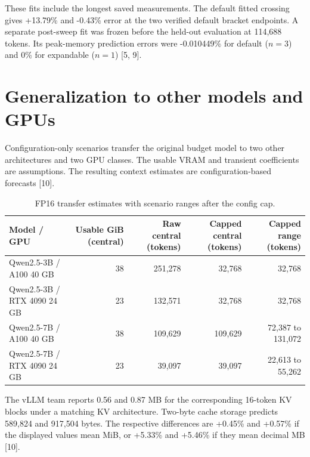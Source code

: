 \documentclass[11pt,a4paper]{article}
\begin{document}
These fits include the longest saved measurements. The default fitted crossing gives +13.79\% and -0.43\% error at the two verified default bracket endpoints. A separate post-sweep fit was frozen before the held-out evaluation at 114,688 tokens. Its peak-memory prediction errors were -0.010449\% for default ($n = 3$) and 0\% for expandable ($n = 1$) [5, 9].

\section{Generalization to other models and GPUs}
Configuration-only scenarios transfer the original budget model to two other architectures and two GPU classes. The usable VRAM and transient coefficients are assumptions. The resulting context estimates are configuration-based forecasts [10].

\begin{table}[htbp]
\centering
\small
\caption{FP16 transfer estimates with scenario ranges after the config cap.}
\begin{tabular}{lrrrr}
\toprule
\textbf{Model / GPU} & \textbf{Usable GiB (central)} & \textbf{Raw central (tokens)} & \textbf{Capped central (tokens)} & \textbf{Capped range (tokens)} \\
\midrule
Qwen2.5-3B / A100 40 GB      & 38 & 251,278 & 32,768  & 32,768 \\
Qwen2.5-3B / RTX 4090 24 GB  & 23 & 132,571 & 32,768  & 32,768 \\
Qwen2.5-7B / A100 40 GB      & 38 & 109,629 & 109,629 & 72,387 to 131,072 \\
Qwen2.5-7B / RTX 4090 24 GB  & 23 & 39,097  & 39,097  & 22,613 to 55,262 \\
\bottomrule
\end{tabular}
\end{table}

The vLLM team reports 0.56 and 0.87 MB for the corresponding 16-token KV blocks under a matching KV architecture. Two-byte cache storage predicts 589,824 and 917,504 bytes. The respective differences are +0.45\% and +0.57\% if the displayed values mean MiB, or +5.33\% and +5.46\% if they mean decimal MB [10].
\end{document}
